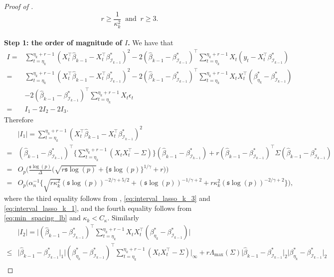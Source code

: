 \documentclass[11pt]{article}
\newcommand{\s}{ { \mathfrak{s}  } }
\theoremstyle{plain}
\theoremstyle{definition}
\begin{document}
\begin{proof}[Proof of ]
$$r \geq \frac{1}{\kappa_k^2} \;\; \text{and} \;\; r \geq 3.$$
\
\\
\textbf{Step 1: the order of magnitude of $I$.} We have that
\begin{align*}
    I =& \sum_{t = \eta_k}^{\eta_k + r - 1}(X_t^{\top}\widehat{\beta}_{k-1} - X_t^{\top}\beta^*_{\mathcal{I}_{k-1}})^2 - 2(\widehat{\beta}_{k-1} - \beta^*_{\mathcal{I}_{k-1}})^{\top}\sum_{t = \eta_k}^{\eta_k + r - 1}X_t(y_t - X_t^{\top}\beta_{\mathcal{I}_{k-1}}^*)\\
    =& \sum_{t = \eta_k}^{\eta_k + r - 1}(X_t^{\top}\widehat{\beta}_{k-1} - X_t^{\top}\beta^*_{\mathcal{I}_{k-1}})^2 - 2(\widehat{\beta}_{k-1} - \beta^*_{\mathcal{I}_{k-1}})^{\top}\sum_{t = \eta_k}^{\eta_k + r - 1}X_tX_t^{\top}(\beta_{\eta_{k}}^* - \beta_{\mathcal{I}_{k-1}}^*)\\
    &- 2(\widehat{\beta}_{k-1} - \beta^*_{\mathcal{I}_{k-1}})^{\top}\sum_{t = \eta_k}^{\eta_k + r - 1}X_t\epsilon_t\\
    =&I_1 - 2I_2 - 2I_3. 
\end{align*}
Therefore
\begin{align*}
    &|I_1| = \sum_{t = \eta_k}^{\eta_k + r - 1}(X_t^{\top}\widehat{\beta}_{k-1} - X_t^{\top}\beta^*_{\mathcal{I}_{k-1}})^2\\
    =& (\widehat{\beta}_{k-1} - \beta^*_{\mathcal{I}_{k-1}})^{\top}\bigg\{\sum_{t = \eta_k}^{\eta_k + r - 1}(X_tX_t^{\top} - \Sigma)\bigg\}(\widehat{\beta}_{k-1} - \beta^*_{\mathcal{I}_{k-1}}) + r(\widehat{\beta}_{k-1} - \beta^*_{\mathcal{I}_{k-1}})^{\top}\Sigma(\widehat{\beta}_{k-1} - \beta^*_{\mathcal{I}_{k-1}})\\
    =& O_{p}\bigg(\frac{\s\log(p)}{ \Delta  }\Big( \sqrt {  r \s\log(p) }  +  \{  \s \log(p) \} ^{1/\gamma } + r \Big)\bigg)\\
    =& O_{p}\bigg(\alpha_n^{-1}\Big\{\sqrt{r\kappa_k^{2}}(\s\log(p))^{-2/\gamma +5/2} + (\s\log(p))^{-1/\gamma +2} + r\kappa_k^{2}(\s\log(p))^{-2/\gamma +2}\Big\}\bigg),
\end{align*}
where the third equality follows from , \eqref{eq:interval_lasso_k_3} and \eqref{eq:interval_lasso_k_1}, and the fourth equality follows from \eqref{eq:min_spacing_lb} and $\kappa_k < C_{\kappa}$.
Similarly
\begin{align*}
    &|I_2| = \bigg|(\widehat{\beta}_{k-1} - \beta^*_{\mathcal{I}_{k-1}})^{\top}\sum_{t = \eta_k}^{\eta_k + r-1}X_tX_t^{\top}(\beta_{\eta_{k}}^* - \beta_{\mathcal{I}_{k-1}}^*)\bigg|\\
    \leq& \big|\widehat{\beta}_{k-1} - \beta^*_{\mathcal{I}_{k-1}}\big|_1\bigg|(\beta_{\eta_{k}}^* - \beta_{\mathcal{I}_{k-1}}^*)^{\top}\sum_{t = \eta_k}^{\eta_k + r - 1}(X_tX_t^{\top} - \Sigma)\bigg|_{\infty} + r\Lambda_{\max}(\Sigma)\big|\widehat{\beta}_{k-1} - \beta^*_{\mathcal{I}_{k-1}}\big|_2\big|\beta_{\eta_{k}}^* - \beta_{\mathcal{I}_{k-1}}^*\big|_2\\

\end{align*}
\end{proof}
\end{document}
